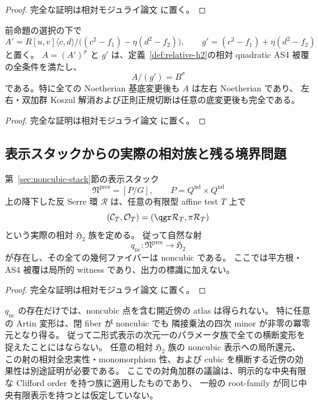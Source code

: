 \begin{proof}
完全な証明は相対モジュライ論文 \cite[\texttt{relative_noncubic_families}]{QuadricModuli2026} に置く。
\end{proof}

\begin{proposition}[全相対 AS4 条件]\label{prop:nc-full-relative-as4}
前命題の選択の下で
\[
 A'=R[u,v]\langle c,d\rangle/
 \bigl((c^2-f_1)-\eta(d^2-f_2)\bigr),\qquad
 g'=(c^2-f_1)+\eta(d^2-f_2)
\]
と置く。
$A=(A')^\sigma$ と $g'$ は、定義~\ref{def:relative-h2}の相対 quadratic AS4 被覆の全条件を満たし、
\[
 A/(g')=B^\sigma
\]
である。特に全ての Noetherian 基底変更後も $A$ は左右 Noetherian であり、
左右・双加群 Koszul 解消および正則正規切断は任意の底変更後も完全である。
\end{proposition}

\begin{proof}
完全な証明は相対モジュライ論文 \cite[\texttt{relative_noncubic_families}]{QuadricModuli2026} に置く。
\end{proof}

\subsection{表示スタックからの実際の相対族と残る境界問題}

\begin{theorem}\label{thm:noncubic-relative-effectivity}
第~\ref{sec:noncubic-stack}節の表示スタック
\[
 \mathfrak N^{\mathrm{pres}}=[P/G],\qquad
 P=Q^{\mathrm{nd}}\times Q^{\mathrm{nd}}
\]
上の降下した反 Serre 環 $\mathcal R$ は、任意の有限型 affine test $T$ 上で
\[
 (\mathcal C_T,\mathcal O_T)=(\qgr\mathcal R_T,\pi\mathcal R_T)
\]
という実際の相対 $\mathfrak H_2$ 族を定める。
従って自然な射
\[
 q_{\mathrm{nc}}:\mathfrak N^{\mathrm{pres}}\longrightarrow\mathfrak H_2
\]
が存在し、その全ての幾何ファイバーは noncubic である。
ここでは平方根・AS4 被覆は局所的 witness であり、出力の標識に加えない。
\end{theorem}

\begin{proof}
完全な証明は相対モジュライ論文 \cite[\texttt{relative_noncubic_families}]{QuadricModuli2026} に置く。
\end{proof}

\begin{remark}
$q_{\mathrm{nc}}$ の存在だけでは、noncubic 点を含む開近傍の atlas は得られない。
特に任意の Artin 変形は、閉 fiber が noncubic でも
隣接乗法の四次 minor が非零の冪零元となり得る。
従って二形式表示の次元一のパラメータ族で全ての横断変形を捉えたことにはならない。
任意の相対 $\mathfrak H_2$ 族の noncubic 表示への局所還元、
この射の相対全忠実性・monomorphism 性、および cubic を横断する近傍の効果性は別途証明が必要である。
ここでの対角加群の議論は、明示的な中央有限な Clifford order を持つ族に適用したものであり、
一般の root-family が同じ中央有限表示を持つとは仮定していない。
\end{remark}
